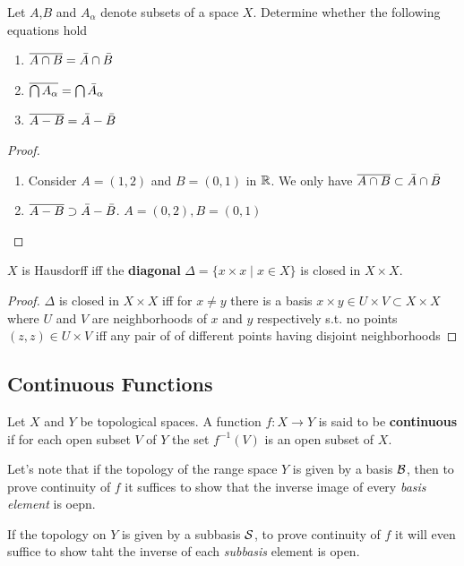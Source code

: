 \documentclass[11pt]{article}
\begin{document}
\begin{exercise}
\label{ex17.8}
Let \(A\),\(B\) and \(A_\alpha\) denote subsets of a space \(X\). Determine whether the following
equations hold
\begin{enumerate}
\item \(\overline{A\cap B}=\bar{A}\cap\bar{B}\)
\item \(\overline{\bigcap A_\alpha}=\bigcap\bar{A}_\alpha\)
\item \(\overline{A-B}=\bar{A}-\bar{B}\)
\end{enumerate}
\end{exercise}

\begin{proof}
\begin{enumerate}
\item Consider \(A=(1,2)\) and \(B=(0,1)\) in \(\mathbb{R}\). We only have \(\overline{A\cap B}\subset\bar{A}\cap\bar{B}\)
\setcounter{enumi}{2}
\item \(\overline{A-B}\supset\bar{A}-\bar{B}\). \(A=(0,2),B=(0,1)\)
\end{enumerate}
\end{proof}

\begin{exercise}
\label{ex17.13}
\(X\) is Hausdorff iff the \textbf{diagonal} \(\Delta=\{x\times x\mid x\in X\}\) is closed in \(X\times X\).
\end{exercise}

\begin{proof}
\(\Delta\) is closed in \(X\times X\) iff for \(x\neq y\) there is a basis \(x\times y\in U\times V\subset X\times X\)
where  \(U\) and \(V\) are neighborhoods of \(x\) and \(y\) respectively s.t. no
points \((z,z)\in U\times V\)
iff any pair of of different points having disjoint neighborhoods
\end{proof}

\subsection{Continuous Functions}
\label{sec:org5f0a2db}
Let \(X\) and \(Y\) be topological spaces. A function \(f:X\to Y\) is said to be \textbf{continuous} if for
each open subset \(V\) of \(Y\) the set \(f^{-1}(V)\) is an open subset of \(X\).

Let's note that if the topology of the range space \(Y\) is given by a basis \(\mathcal{B}\), then to prove
continuity of \(f\) it suffices to show that the inverse image of every \emph{basis element} is oepn.

If the topology on \(Y\) is given by a subbasis \(\mathcal{S}\), to prove continuity of \(f\) it will even
suffice to show taht the inverse of each \emph{subbasis} element is open.
\end{document}
